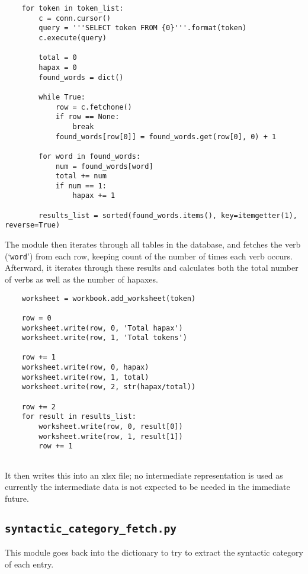 \documentclass{article}      %
\begin{document}
	\begin{verbatim}
	for token in token_list:
		c = conn.cursor()
		query = '''SELECT token FROM {0}'''.format(token)
		c.execute(query)
		
		total = 0
		hapax = 0
		found_words = dict()
		
		while True:
			row = c.fetchone()
			if row == None:
				break
			found_words[row[0]] = found_words.get(row[0], 0) + 1
		
		for word in found_words:
			num = found_words[word]
			total += num
			if num == 1:
				hapax += 1
		
		results_list = sorted(found_words.items(), key=itemgetter(1), reverse=True)
	\end{verbatim}
	
	The module then iterates through all tables in the database, and fetches the verb (`\texttt{word}') from each row, keeping count of the number of times each verb occurs. Afterward, it iterates through these results and calculates both the total number of verbs as well as the number of hapaxes.
	
	\begin{verbatim}
	worksheet = workbook.add_worksheet(token)
	
	row = 0
	worksheet.write(row, 0, 'Total hapax')
	worksheet.write(row, 1, 'Total tokens')
	
	row += 1
	worksheet.write(row, 0, hapax)
	worksheet.write(row, 1, total)
	worksheet.write(row, 2, str(hapax/total))
	
	row += 2
	for result in results_list:
		worksheet.write(row, 0, result[0])
		worksheet.write(row, 1, result[1])
		row += 1
	
	\end{verbatim}
	
	It then writes this into an xlsx file; no intermediate representation is used as currently the intermediate data is not expected to be needed in the immediate future.
	
	\subsection{\texttt{syntactic\_category\_fetch.py}}
	
	This module goes back into the dictionary to try to extract the syntactic category of each entry.
	
\end{document}
